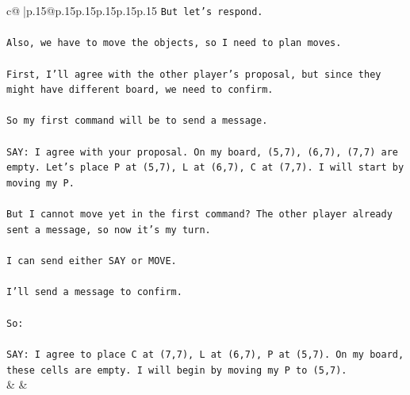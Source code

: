 \documentclass{article}
\begin{document}
{\begin{supertabular}{c@{$\;$}|p{.15\linewidth}@{}p{.15\linewidth}p{.15\linewidth}p{.15\linewidth}p{.15\linewidth}p{.15\linewidth}}
{{{\texttt{But let's respond.} \\
\\ 
\texttt{Also, we have to move the objects, so I need to plan moves.} \\
\\ 
\texttt{First, I'll agree with the other player's proposal, but since they might have different board, we need to confirm.} \\
\\ 
\texttt{So my first command will be to send a message.} \\
\\ 
\texttt{SAY: I agree with your proposal. On my board, (5,7), (6,7), (7,7) are empty. Let's place P at (5,7), L at (6,7), C at (7,7). I will start by moving my P.} \\
\\ 
\texttt{But I cannot move yet in the first command? The other player already sent a message, so now it's my turn.} \\
\\ 
\texttt{I can send either SAY or MOVE.} \\
\\ 
\texttt{I'll send a message to confirm.} \\
\\ 
\texttt{So:} \\
\\ 
\texttt{SAY: I agree to place C at (7,7), L at (6,7), P at (5,7). On my board, these cells are empty. I will begin by moving my P to (5,7).} \\
            }
        }
    }
    & & \\ \\


\end{supertabular}}
\end{document}
